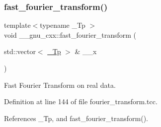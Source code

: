 \subsubsection{\texorpdfstring{fast\+\_\+fourier\+\_\+transform()}{fast\_fourier\_transform()}\hspace{0.1cm}{\footnotesize\ttfamily [2/3]}}
{\footnotesize\ttfamily template$<$typename \+\_\+\+Tp $>$ \\
void \+\_\+\+\_\+gnu\+\_\+cxx\+::fast\+\_\+fourier\+\_\+transform (\begin{DoxyParamCaption}\item[{std\+::vector$<$ \hyperlink{namespace____gnu__cxx_a3b19a9c800ca194374ef9172290f7d79}{\+\_\+\+Tp} $>$ \&}]{\+\_\+\+\_\+x }\end{DoxyParamCaption})}

Fast Fourier Transform on real data. 

Definition at line 144 of file fourier\+\_\+transform.\+tcc.



References \+\_\+\+Tp, and fast\+\_\+fourier\+\_\+transform().


